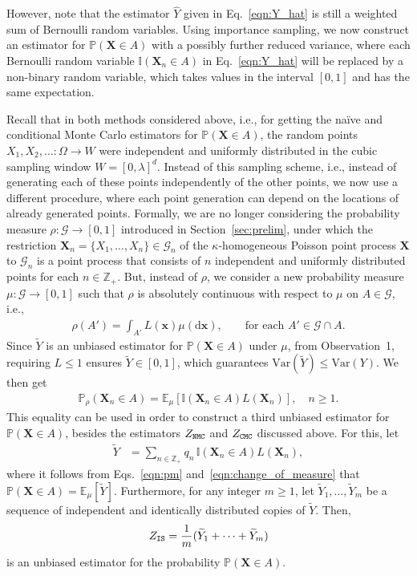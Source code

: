 \documentclass[pdflatex, sn-mathphys-ay]{sn-jnl}%
\newcommand{\intg}{\mathbb{Z}}
\newcommand{\ind}{\mathbb{I}}
\newcommand{\mc}{\mathcal}
\renewcommand{\v}[1]{\boldsymbol{#1}}
\newcommand{\pp}{\mathbb{P}}
\newcommand{\dd}{\mathrm{d}}
\newcommand{\ee}{\mathbb{E}}
\newcommand{\mx}{\v{x}}
\newcommand{\mX}{\v{X}}
\newcommand{\scG}{\mathscr{G}}
\newcommand{\wt}{\widetilde}
\theoremstyle{thmstyleone}%
\theoremstyle{thmstyletwo}%
\theoremstyle{thmstylethree}%
\begin{document}
However, note that the estimator $\widehat Y$ given in Eq.~\eqref{eqn:Y_hat}
is still a weighted sum of Bernoulli random variables. Using importance sampling, 
we now construct an estimator for  $\pp(\mX \in A)$ with a possibly further reduced variance,  where each Bernoulli random variable 
$\ind(\mX_n \in A)$ in  Eq.~\eqref{eqn:Y_hat} will be replaced by a non-binary random variable, which takes values in the interval $[0, 1]$ and has  the same expectation. 

Recall that in both methods considered above, i.e., for getting the   na\"{i}ve and conditional Monte Carlo estimators for  $\pp(\mX \in A)$, the random points  $X_1, X_2, \ldots:\Omega\to W$ were independent and uniformly distributed in the cubic sampling window $W = [0, \lambda]^d$. Instead of this sampling scheme, i.e., instead of generating each of these points independently of the other points, 
we now use a different procedure, where each point generation can depend on the locations of already generated points. 
Formally, we are no longer considering
the  probability measure $\rho:\mc G\to[0,1]$ 
introduced in Section~\ref{sec:prelim},
under which 
the restriction $\mX_n = \{X_1, \dots, X_n\} \in \scG_n$ of the $\kappa$-homogeneous Poisson point process $\mX$  to $\scG_n$  is
a point process that consists of $n$ independent and uniformly distributed points 
for each $n \in \intg_+$. 
But, instead of $\rho$, we consider a new probability measure $\mu:\mc G\to[0,1]$  {  such that $\rho$ is absolutely continuous with respect to $\mu$ on  $A \in  \mc G$}, i.e., 
\begin{align}
\rho(A')=\int_{A'}
 L(\mx) \mu(\dd\mx),
	\label{eqn:likelihood} \qquad\mbox{for each $A'\in  {\mc G }\cap A $.}
\end{align}
{  Since $\widetilde{Y}$
  is an unbiased estimator for $\mathbb{P}(\boldsymbol{X} \in A)$ under $\mu$,
  from Observation~1, requiring $L \leq 1$ ensures $\widetilde{Y} \in [0,1]$, which guarantees
  $\mathrm{Var}(\widetilde{Y}) \leq \mathrm{Var}(Y)$.} We then get 
\begin{align}
	\pp_\rho(\mX_n \in A) = \ee_\mu[\ind(\mX_n \in A) L(\mX_n)], \quad n\ge 1. \label{eqn:change_of_measure}
\end{align}
This equality can be used in order to construct a third unbiased estimator for $\pp(\mX \in A)$, besides the estimators $Z_{\tt NMC}$ and $ Z_{\tt CMC}$ discussed above. For this, let
\begin{align}
\label{eqn:Y-tilde} 
\wt Y &= \sum_{n \in \intg_+} q_n\, \ind(\mX_n \in A)L(\mX_n),
\end{align} 
where it follows from Eqs.~\eqref{eqn:pm} and~\eqref{eqn:change_of_measure} that 
\(\pp(\mX \in A)= \ee_\mu[\wt Y].\)
Furthermore, for any integer $m\ge 1$, let $\wt Y_1, \dots, \wt Y_m$ be a sequence of independent and identically distributed copies of $\wt Y$. 
Then,  
\begin{align}\label{def.wt.zet}
Z_{\tt IS} = \frac{1}{m}(\wt Y_1 + \cdots + \wt Y_m)
\end{align}
is an unbiased estimator for the probability  $\pp(\mX \in A)$.
\end{document}

